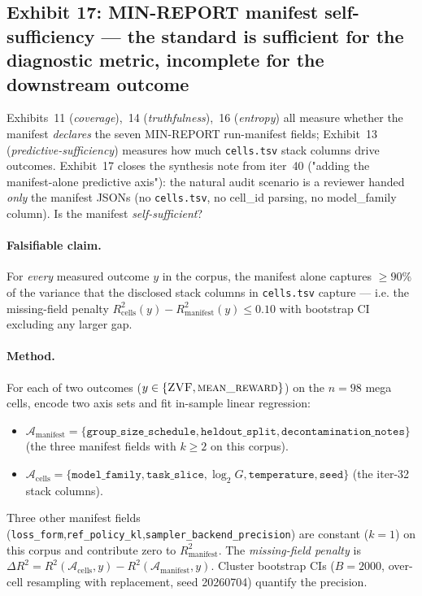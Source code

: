 \documentclass{article}  \usepackage[preprint,nonatbib]{neurips_2026} \usepackage[numbers]{natbib}
\begin{document}
\subsection{Exhibit 17: MIN-REPORT manifest self-sufficiency — the standard is sufficient for the diagnostic metric, incomplete for the downstream outcome}
\label{sec:p5-exhibit-manifest-self-suff}

Exhibits~11 (\emph{coverage}),~14 (\emph{truthfulness}),~16
(\emph{entropy}) all measure whether the manifest \emph{declares} the
seven MIN-REPORT run-manifest fields; Exhibit~13 (\emph{predictive-sufficiency})
measures how much \texttt{cells.tsv} stack columns drive outcomes. Exhibit~17
closes the synthesis note from iter~40 ("adding the manifest-alone
predictive axis"): the natural audit scenario is a reviewer handed
\emph{only} the manifest JSONs (no \texttt{cells.tsv}, no cell\_id parsing,
no model\_family column). Is the manifest \emph{self-sufficient}?

\paragraph{Falsifiable claim.}
For \emph{every} measured outcome $y$ in the corpus, the manifest
alone captures $\geq 90\%$ of the variance that the disclosed stack
columns in \texttt{cells.tsv} capture --- i.e. the missing-field penalty
$R^2_\text{cells}(y) - R^2_\text{manifest}(y) \leq 0.10$ with
bootstrap CI excluding any larger gap.

\paragraph{Method.}
For each of two outcomes ($y\in\{\textsc{ZVF},\textsc{mean\_reward}\}$)
on the $n{=}98$ mega cells, encode two axis sets and fit in-sample
linear regression:
\begin{itemize}\itemsep0pt
  \item $\mathcal{A}_\text{manifest} = \{\texttt{group\_size\_schedule},
        \texttt{heldout\_split}, \texttt{decontamination\_notes}\}$
        (the three manifest fields with $k\geq 2$ on this corpus).
  \item $\mathcal{A}_\text{cells} = \{\texttt{model\_family},
        \texttt{task\_slice}, \log_2 G, \texttt{temperature},
        \texttt{seed}\}$ (the iter-32 stack columns).
\end{itemize}
Three other manifest fields
(\texttt{loss\_form},\texttt{ref\_policy\_kl},\texttt{sampler\_backend\_precision})
are constant ($k{=}1$) on this corpus and contribute zero to
$R^2_\text{manifest}$. The \emph{missing-field penalty} is
$\Delta R^2 = R^2(\mathcal{A}_\text{cells}, y) -
R^2(\mathcal{A}_\text{manifest}, y)$. Cluster bootstrap CIs
($B{=}2000$, over-cell resampling with replacement, seed 20260704)
quantify the precision.
\end{document}
